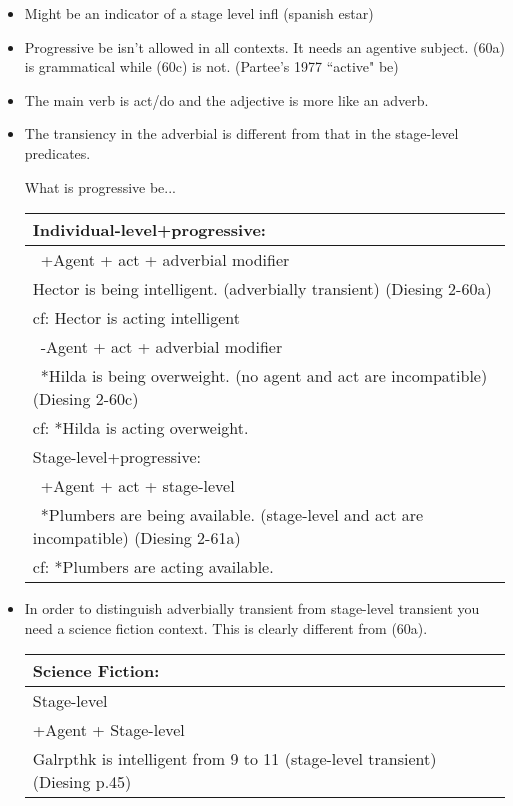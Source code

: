 \documentclass[landscape]{article}
\begin{document}
\begin{itemize}
\item Might be an indicator of a stage level infl (spanish estar)

\item Progressive be isn't allowed in all contexts. It needs an agentive subject. (60a) is grammatical while (60c) is not. (Partee's 1977 ``active" be)

\item The main verb is act/do and the adjective is more like an adverb. 

\item The transiency in the adverbial is different from that in the stage-level predicates.

\begin{example}What is progressive be...\\
\begin{tabular}{|l|}\hline
Individual-level+progressive: \\\hline\hline
~+Agent + act + adverbial modifier\\
Hector is being intelligent. (adverbially transient) (Diesing 2-60a)\\
cf: Hector is acting intelligent\\\hline
~-Agent + act + adverbial modifier\\
~*Hilda is being overweight. (no agent and act are incompatible) (Diesing 2-60c)\\
cf: *Hilda is acting overweight.\\\hline\hline
Stage-level+progressive:\\\hline\hline
~+Agent + act + stage-level\\
~*Plumbers are being available. (stage-level and act are incompatible) (Diesing 2-61a)\\
cf: *Plumbers are acting available.\\\hline
\end{tabular}
\end{example}


\item In order to distinguish adverbially transient from stage-level transient you need a science fiction context. This is clearly different from (60a).


\begin{example}
\begin{tabular}{|l|}\hline
Science Fiction:
\\\hline\hline
Stage-level\\
+Agent + Stage-level
\\
Galrpthk is intelligent from 9 to 11 (stage-level transient) (Diesing p.45)\\\hline
\end{tabular}
\end{example}


\end{itemize}
\end{document}
